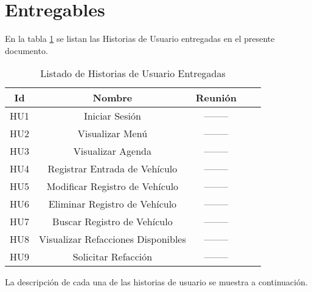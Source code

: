 \section{Entregables}

En la tabla \ref{tab: Listado de Historias de Usuario Entregadas} se listan las Historias de Usuario entregadas en el presente documento.

\begin{table}[h]
	\begin{center}
		\begin{tabular}{|c|c|c|c|c|}
			\hline 
			\textbf{Id} & \textbf{Nombre} & \textbf{Reunión} \\ 
			\hline 
			HU1  & Iniciar Sesión  & --------  \\
			HU2  & Visualizar Menú  & --------  \\ 
			HU3  & Visualizar Agenda  & --------  \\
			HU4  & Registrar Entrada de Vehículo  & --------  \\
			HU5  & Modificar Registro de Vehículo  & --------  \\
			HU6  & Eliminar Registro de Vehículo  & --------  \\
			HU7  & Buscar Registro de Vehículo  & --------  \\
			HU8  & Visualizar Refacciones Disponibles  & --------  \\
			HU9  & Solicitar Refacción  & --------  \\
			\hline 
		\end{tabular}
	\end{center}
	\label{tab: Listado de Historias de Usuario Entregadas}
	\caption{Listado de Historias de Usuario Entregadas}
\end{table}

La descripción de cada una de las historias de usuario se muestra a continuación.